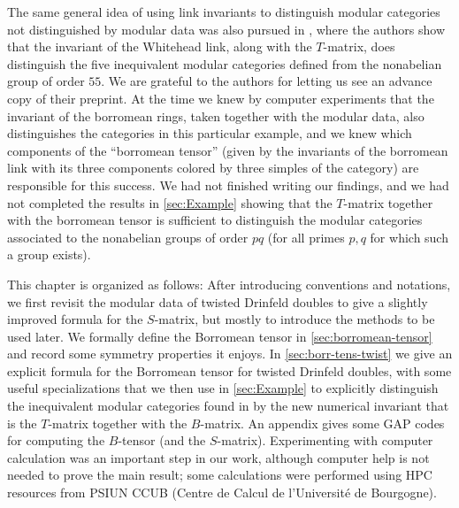 \documentclass[11pt]{book}
\theoremstyle{Rem}
\theoremstyle{definition}
\numberwithin{equation}{section}
\begin{document}
The same general idea of using link invariants to distinguish modular categories not distinguished by modular data was also pursued in \cite{2018arXiv180505736B}, where the authors show that the invariant of the Whitehead link, along with the $T$-matrix, does distinguish the five inequivalent modular categories defined from the nonabelian group of order $55$. We are grateful to the authors for letting us see an advance copy of their preprint. At the time we knew by computer experiments that the invariant of the borromean rings, taken together with the modular data, also distinguishes the categories in this particular example, and we knew which components of the ``borromean tensor'' (given by the invariants of the borromean link with its three components colored by three simples of the category) are responsible for this success. We had not finished writing our findings, and we had not completed the results in \cref{sec:Example} showing that the $T$-matrix together with the borromean tensor is sufficient to distinguish the modular categories associated to the nonabelian groups of order $pq$ (for all primes $p,q$ for which such a group exists).

This chapter is organized as follows: After introducing conventions and notations, we first revisit the modular data of twisted Drinfeld doubles to give a slightly improved formula for the $S$-matrix, but mostly to introduce the methods to be used later. We formally define the Borromean tensor in \cref{sec:borromean-tensor} and record some symmetry properties it enjoys. In \cref{sec:borr-tens-twist} we give an explicit formula for the Borromean tensor for twisted Drinfeld doubles, with some useful specializations that we then use in \cref{sec:Example} to explicitly distinguish the inequivalent modular categories found in \cite{2017arXiv170802796M} by the new numerical invariant that is the $T$-matrix together with the $B$-matrix. An appendix gives some GAP codes for computing the $B$-tensor (and the $S$-matrix). Experimenting with computer calculation was an important step in our work, although computer help is not needed to prove the main result; some calculations were performed using HPC resources from PSIUN CCUB (Centre de Calcul de
l'Université de Bourgogne).
\end{document}
